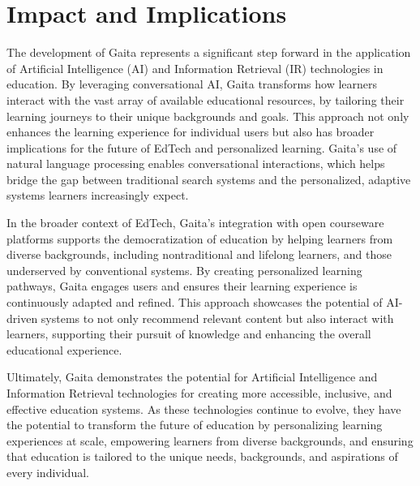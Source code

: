 \section{Impact and Implications}


The development of Gaita represents a significant step forward in the application of Artificial Intelligence (AI) and Information Retrieval (IR) technologies in education. By leveraging conversational AI, Gaita transforms how learners interact with the vast array of available educational resources, by tailoring their learning journeys to their unique backgrounds and goals. This approach not only enhances the learning experience for individual users but also has broader implications for the future of EdTech and personalized learning. Gaita’s use of natural language processing enables conversational interactions, which helps bridge the gap between traditional search systems and the personalized, adaptive systems learners increasingly expect.

In the broader context of EdTech, Gaita’s integration with open courseware platforms supports the democratization of education by helping learners from diverse backgrounds, including nontraditional and lifelong learners, and those underserved by conventional systems. By creating personalized learning pathways, Gaita engages users and ensures their learning experience is continuously adapted and refined. This approach showcases the potential of AI-driven systems to not only recommend relevant content but also interact with learners, supporting their pursuit of knowledge and enhancing the overall educational experience.

Ultimately, Gaita demonstrates the potential for Artificial Intelligence and Information Retrieval technologies for creating more accessible, inclusive, and effective education systems. As these technologies continue to evolve, they have the potential to transform the future of education by personalizing learning experiences at scale, empowering learners from diverse backgrounds, and ensuring that education is tailored to the unique needs, backgrounds, and aspirations of every individual.
